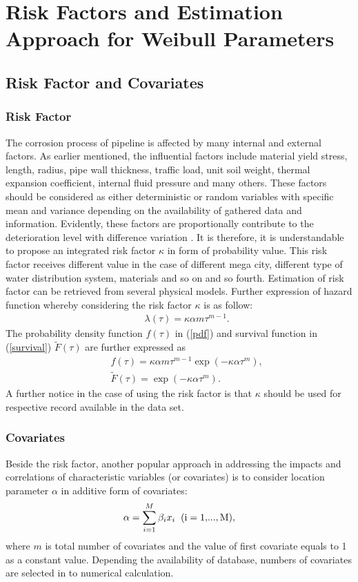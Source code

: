 \section{Risk Factors and Estimation Approach for Weibull Parameters}
\label{55}
\subsection{Risk Factor and Covariates}
\label{551}
\subsubsection{Risk Factor}
\label{5511}
The corrosion process of pipeline is affected by many internal and external factors. As earlier mentioned, the influential factors include material yield stress, length, radius, pipe wall thickness, traffic load, unit soil weight, thermal expansion coefficient, internal fluid pressure and many others. These factors should be considered as either deterministic or random variables with specific mean and variance depending on the availability of gathered data and information. Evidently, these factors are proportionally contribute to the deterioration level with difference variation \cite{ahammed95,ahammed97}. It is therefore, it is understandable to propose an integrated risk factor $\kappa$ in form of probability value. This risk factor receives different value in the case of different mega city, different type of water distribution system, materials and so on and so fourth. Estimation of risk factor can be retrieved from several physical models. Further expression of hazard function whereby considering the risk factor $\kappa$ is as follow:
\begin{eqnarray}
&& \lambda(\tau)= \kappa \alpha m \tau^{m-1}. \label{weibul1}
\end{eqnarray}
The probability density function $f(\tau)$ in (\ref{pdf}) and survival function in (\ref{survival}) $\tilde{F}(\tau)$ are further expressed as
\begin{eqnarray}
&& f(\tau)=\kappa \alpha m\tau^{m-1}\exp(-\kappa \alpha \tau^m), \label{pdf1} \\
&& \tilde{F}(\tau)=\exp(-\kappa \alpha \tau^m). \label{survival1}
\end{eqnarray}
A further notice in the case of using the risk factor is that $\kappa$ should be used for respective record available in the data set.
\subsubsection{Covariates}
\label{5512}
Beside the risk factor, another popular approach in addressing the impacts and correlations of characteristic variables (or covariates) is to consider location parameter $\alpha$ in additive form of covariates:
\begin{eqnarray}
\alpha  = \sum\limits_{i = 1}^M {\beta _i x_i \rm{  \hspace{2mm}   (i = 1,}}...{\rm{,M)}}, \label{covariate}
\end{eqnarray}
where $m$ is total number of covariates and the value of first covariate equals to 1 as a constant value. Depending the availability of database, numbers of covariates are selected in to numerical calculation.
